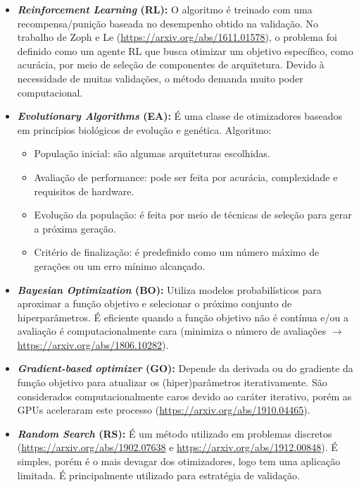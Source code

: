 \documentclass[a4paper,12pt]{article}
\begin{document}
\begin{itemize}[noitemsep]
    \item \textbf{\textit{Reinforcement Learning} (RL):} O algoritmo é treinado com uma recompensa/punição baseada no desempenho obtido na validação. No trabalho de Zoph e Le (\url{https://arxiv.org/abs/1611.01578}), o problema foi definido como um agente RL que busca otimizar um objetivo específico, como acurácia, por meio de seleção de componentes de arquitetura. Devido à necessidade de muitas validações, o método demanda muito poder computacional. 
    
    \item \textbf{\textit{Evolutionary Algorithms} (EA):} É uma classe de otimizadores baseados em princípios biológicos de evolução e genética. Algoritmo:
    
        \begin{itemize}
            \item População inicial: são algumas arquiteturas escolhidas.
            \item Avaliação de performance: pode ser feita por acurácia, complexidade e requisitos de hardware.
            \item Evolução da população: é feita por meio de técnicas de seleção para gerar a próxima geração.
            \item Critério de finalização: é predefinido como um número máximo de gerações ou um erro mínimo alcançado.
        \end{itemize}
    
    \item \textbf{\textit{Bayesian Optimization} (BO):} Utiliza modelos probabilísticos para aproximar a função objetivo e selecionar o próximo conjunto de hiperparâmetros. É eficiente quando a função objetivo não é contínua e/ou a avaliação é computacionalmente cara (minimiza o número de avaliações $\rightarrow$ \url{https://arxiv.org/abs/1806.10282}).
    
    \item \textbf{\textit{Gradient-based optimizer} (GO):} Depende da derivada ou do gradiente da função objetivo para atualizar os (hiper)parâmetros iterativamente. São considerados computacionalmente caros devido ao caráter iterativo, porém as GPUs aceleraram este processo (\url{https://arxiv.org/abs/1910.04465}).
    
    \item \textbf{\textit{Random Search} (RS):} É um método utilizado em problemas discretos (\url{https://arxiv.org/abs/1902.07638} e \url{https://arxiv.org/abs/1912.00848}). É simples, porém é o mais devagar dos otimizadores, logo tem uma aplicação limitada. É principalmente utilizado para estratégia de validação.
\end{itemize}
\end{document}
